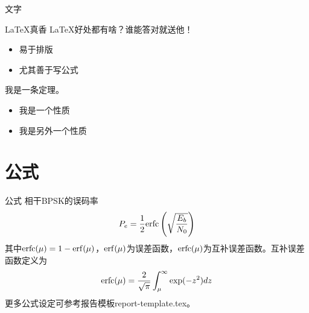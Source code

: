 \documentclass{beamer}
\begin{document}
\begin{frame}{文字} %
    \begin{block}{\LaTeX 真香}
        \LaTeX 好处都有啥？谁能答对就送他！
    \end{block}
    \begin{itemize}
        \item 易于排版
        \item 尤其善于写公式
    \end{itemize}
    \begin{theorem}
        我是一条定理。
    \end{theorem}
    \begin{itemize}
        \item 我是一个性质
        \item 我是另外一个性质
    \end{itemize}
\end{frame}

\section{公式}
\begin{frame}{公式}
    相干BPSK的误码率\cite{Hykin-2001}
    \begin{equation}
        P_e = \frac{1}{2} {\rm erfc} \left( \sqrt{\frac{E_b}{N_0}} \right)
    \end{equation}
    其中${\rm erfc}(\mu) = 1 - {\rm erf}(\mu)$，${\rm erf}(\mu)$为误差函数，${\rm erfc} (\mu)$为互补误差函数。互补误差函数定义为
    \begin{equation}
        {\rm erfc}(\mu) = \frac{2}{\sqrt \pi} \int_{\mu}^{\infty} \exp (-z^2) dz
    \end{equation}
    更多公式设定可参考报告模板report-template.tex。
\end{frame}
\end{document}
